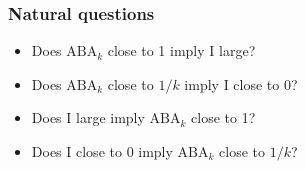 \documentclass{beamer}
\newcommand{\E}{\textbf{E}}
\begin{document}






\begin{frame}
\frametitle{Natural questions}
\begin{itemize}
\item Does $\text{ABA}_k$ close to 1 imply $\text{I}$ large?
\item Does $\text{ABA}_k$ close to $1/k$ imply $\text{I}$ close to 0?
\item Does $\text{I}$ large imply $\text{ABA}_k$ close to 1?
\item Does $\text{I}$ close to $0$ imply $\text{ABA}_k$ close to $1/k$?
\end{itemize}
\end{frame}
\end{document}
